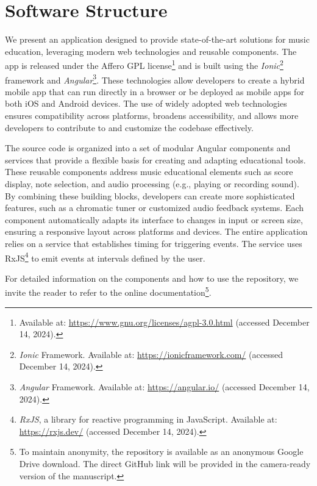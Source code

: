 \documentclass[runningheads]{llncs}
\begin{document}
\section{Software Structure}
\label{sec:repo}
\vspace*{12pt}

We present an application designed to provide state-of-the-art solutions for music education, leveraging modern web technologies and reusable components. The app is released under the Affero GPL license\footnote{Available at: \url{https://www.gnu.org/licenses/agpl-3.0.html} (accessed December 14, 2024).} and is built using the \emph{Ionic}\footnote{\textit{Ionic} Framework. Available at: \url{https://ionicframework.com/} (accessed December 14, 2024).} framework and \emph{Angular}\footnote{\textit{Angular} Framework. Available at: \url{https://angular.io/} (accessed December 14, 2024).}. These technologies allow developers to create a hybrid mobile app that can run directly in a browser or be deployed as mobile apps for both iOS and Android devices.
The use of widely adopted web technologies ensures compatibility across platforms, broadens accessibility, and allows more developers to contribute to and customize the codebase effectively.

The source code is organized into a set of modular Angular components and services that provide a flexible basis for creating and adapting educational tools.
These reusable components address music educational elements such as score display, note selection, and audio processing (e.g., playing or recording sound). By combining these building blocks, developers can create more sophisticated features, such as a chromatic tuner or customized audio feedback systems. Each component automatically adapts its interface to changes in input or screen size, ensuring a responsive layout across platforms and devices.
The entire application relies on a service that establishes timing for triggering events. The service uses RxJS\footnote{\textit{RxJS}, a library for reactive programming in JavaScript. Available at: \url{https://rxjs.dev/} (accessed December 14, 2024).} to emit events at intervals defined by the user.

For detailed information on the components and how to use the repository, we invite the reader to refer to the online documentation\footnote{To maintain anonymity, the repository is available as an anonymous Google Drive download. The direct GitHub link will be provided in the camera-ready version of the manuscript.}.
\end{document}
